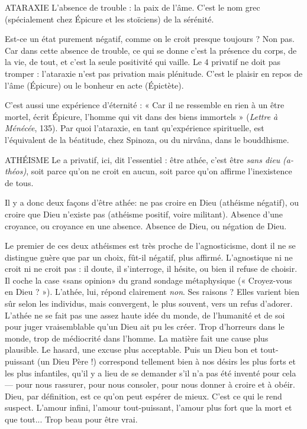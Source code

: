 ATARAXIE L’absence de trouble : la paix de l’âme. C’est le nom grec (spécialement
chez Épicure et les stoïciens) de la sérénité.

Est-ce un état purement négatif, comme on le croit presque toujours ? Non
pas. Car dans cette absence de trouble, ce qui se donne c’est la présence du
corps, de la vie, de tout, et c’est la seule positivité qui vaille. Le 4 privatif ne doit
pas tromper : l’ataraxie n’est pas privation mais plénitude. C’est le plaisir en
repos de l’âme (Épicure) ou le bonheur en acte (Épictète).

C’est aussi une expérience d’éternité : « Car il ne ressemble en rien à un être
mortel, écrit Épicure, l'homme qui vit dans des biens immortels » ({\it Lettre à
Ménécée}, 135). Par quoi l’ataraxie, en tant qu’expérience spirituelle, est l’équivalent
de la béatitude, chez Spinoza, ou du nirvâna, dans le bouddhisme.

ATHÉISME Le a privatif, ici, dit l’essentiel : être athée, c’est être {\it sans dieu}
{\it (a-théos)}, soit parce qu’on ne croit en aucun, soit parce qu’on
affirme l’inexistence de tous.

Il y a donc deux façons d’être athée: ne pas croire en Dieu (athéisme
négatif), ou croire que Dieu n’existe pas (athéisme positif, voire militant).
Absence d’une croyance, ou croyance en une absence. Absence de Dieu, ou
négation de Dieu.

Le premier de ces deux athéismes est très proche de l’agnosticisme, dont il
ne se distingue guère que par un choix, fût-il négatif, plus affirmé. L’agnostique
ni ne croit ni ne croit pas : il doute, il s’interroge, il hésite, ou bien il refuse de
choisir. Il coche la case «sans opinion» du grand sondage métaphysique
(« Croyez-vous en Dieu ? »). L’athée, lui, répond clairement {\it non}. Ses raisons ?
Elles varient bien sûr selon les individus, mais convergent, le plus souvent, vers
un refus d’adorer. L’athée ne se fait pas une assez haute idée du monde, de
l'humanité et de soi pour juger vraisemblable qu’un Dieu ait pu les créer. Trop
d’horreurs dans le monde, trop de médiocrité dans l’homme. La matière fait
une cause plus plausible. Le hasard, une excuse plus acceptable. Puis un Dieu
bon et tout-puissant (un Dieu Père !) correspond tellement bien à nos désirs les
plus forts et les plus infantiles, qu’il y a lieu de se demander s’il n’a pas été
inventé pour cela — pour nous rassurer, pour nous consoler, pour nous donner
à croire et à obéir. Dieu, par définition, est ce qu’on peut espérer de mieux.
C’est ce qui le rend suspect. L'amour infini, l'amour tout-puissant, l'amour
plus fort que la mort et que tout... Trop beau pour être vrai.

